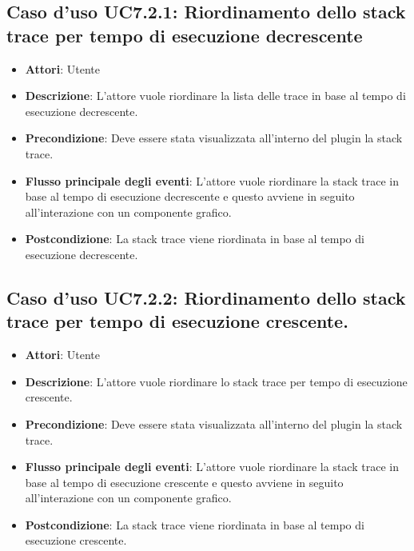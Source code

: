 \subsection{Caso d'uso UC7.2.1: Riordinamento dello stack trace per tempo di esecuzione decrescente}
\begin{itemize}
\item \textbf{Attori}: Utente
\item \textbf{Descrizione}: L'attore vuole riordinare la lista delle trace in base al tempo di esecuzione decrescente.
\item \textbf{Precondizione}: Deve essere stata visualizzata all'interno del plugin la stack trace.
\item \textbf{Flusso principale degli eventi}: L'attore vuole riordinare la stack trace in base al tempo di esecuzione decrescente e questo avviene in seguito all'interazione con un componente grafico.
\item \textbf{Postcondizione}: La stack trace viene riordinata in base al tempo di esecuzione decrescente.
\end{itemize}
\subsection{Caso d'uso UC7.2.2: Riordinamento dello stack trace per tempo di esecuzione crescente.}
\begin{itemize}
\item \textbf{Attori}: Utente
\item \textbf{Descrizione}: L'attore vuole riordinare lo stack trace per tempo di esecuzione crescente.
\item \textbf{Precondizione}: Deve essere stata visualizzata all'interno del plugin la stack trace.
\item \textbf{Flusso principale degli eventi}: L'attore vuole riordinare la stack trace in base al tempo di esecuzione crescente e questo avviene in seguito all'interazione con un componente grafico.
\item \textbf{Postcondizione}: La stack trace viene riordinata in base al tempo di esecuzione crescente.
\end{itemize}
